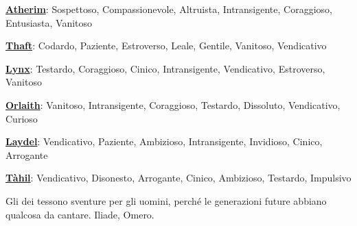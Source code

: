\begin{multicols}{2}
{\smallskip

\textbf{\hyperlink{atherim}{Atherim}}: Sospettoso, Compassionevole, Altruista, Intransigente, Coraggioso, Entusiasta, Vanitoso\

\smallskip

\textbf{\hyperlink{thaft}{Thaft}}: Codardo, Paziente, Estroverso, Leale, Gentile, Vanitoso, Vendicativo

\smallskip

\textbf{\hyperlink{lynx}{Lynx}}: Testardo, Coraggioso, Cinico, Intransigente, Vendicativo, Estroverso, Vanitoso

\smallskip

\textbf{\hyperlink{orlaith}{Orlaith}}: Vanitoso, Intransigente, Coraggioso, Testardo, Dissoluto, Vendicativo, Curioso

\smallskip

\textbf{\hyperlink{laydel}{Laydel}}: Vendicativo, Paziente, Ambizioso, Intransigente, Invidioso, Cinico, Arrogante

\smallskip

\textbf{\hyperlink{tahil}{Tàhil}}: Vendicativo, Disonesto, Arrogante, Cinico, Ambizioso, Testardo, Impulsivo

}

\end{multicols}

\vfill

\begin{enfasi}
	Gli dei tessono sventure per gli uomini, perché le generazioni future abbiano qualcosa da cantare. Iliade, Omero.
\end{enfasi}




\pagebreak

